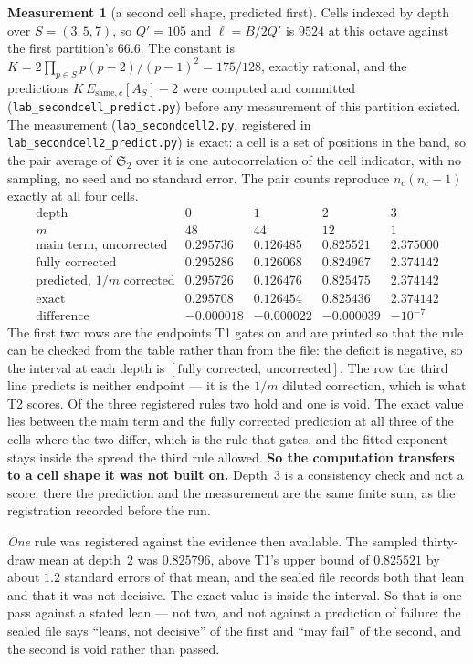 \documentclass[11pt,a4paper]{article}
\theoremstyle{plain}
\theoremstyle{definition}
\newtheorem{measurement}[theorem]{Measurement}
\theoremstyle{remark}
\renewcommand{\SS}{\mathfrak{S}}
\begin{document}
\begin{measurement}[a second cell shape, predicted first]
Cells indexed by depth over $S=(3,5,7)$, so $Q'=105$ and
$\ell=B/2Q'$ is $9524$ at this octave against the first partition's
$66.6$. The constant is $K=2\prod_{p\in S}p(p-2)/(p-1)^2=175/128$,
exactly rational, and the predictions
$K\,E_{\mathrm{same},c}[A_S]-2$ were computed and committed
(\texttt{lab\_secondcell\_predict.py}) before any measurement of this
partition existed. The measurement (\texttt{lab\_secondcell2.py},
registered in \texttt{lab\_secondcell2\_predict.py}) is exact: a cell
is a set of
positions in the band, so the pair average of $\SS_2$ over it is one
autocorrelation of the cell indicator, with no sampling, no seed and no
standard error. The pair counts reproduce $n_c(n_c-1)$ exactly at all
four cells.
\[
\begin{array}{r|cccc}
 \text{depth} & 0 & 1 & 2 & 3\\\hline
 m & 48 & 44 & 12 & 1\\
 \text{main term, uncorrected} & 0.295736 & 0.126485 & 0.825521 & 2.375000\\
 \text{fully corrected} & 0.295286 & 0.126068 & 0.824967 & 2.374142\\
 \text{predicted, }1/m\text{ corrected} & 0.295726 & 0.126476 & 0.825475 & 2.374142\\
 \text{exact} & 0.295708 & 0.126454 & 0.825436 & 2.374142\\
 \text{difference} & -0.000018 & -0.000022 & -0.000039 & -10^{-7}
\end{array}
\]
The first two rows are the endpoints T1 gates on and are printed so
that the rule can be checked from the table rather than from the file:
the deficit is negative, so the interval at each depth is
$[\text{fully corrected},\,\text{uncorrected}]$. The row the third line
predicts is neither endpoint --- it is the $1/m$ diluted correction,
which is what T2 scores.
Of the three registered rules two hold and one is void. The exact
value lies between the main term and the fully corrected prediction at
all three of the cells where the two differ, which is the rule that
gates, and the fitted exponent stays inside the spread the third rule
allowed. \textbf{So the computation transfers to a cell shape it was
not built on.} Depth~$3$ is a
consistency check and not a score: there the prediction and the
measurement are the same finite sum, as the registration recorded
before the run.

\emph{One} rule was registered against the evidence then available.
The sampled thirty-draw mean at depth~$2$ was $0.825796$, above T1's
upper bound of $0.825521$ by about $1.2$ standard errors of that mean,
and the sealed file records both that lean and that it was not
decisive. The exact value is inside the interval. So that is one pass
against a stated lean --- not two, and not against a prediction of
failure: the sealed file says ``leans, not decisive'' of the first and
``may fail'' of the second, and the second is void rather than passed.


\end{measurement}
\end{document}
